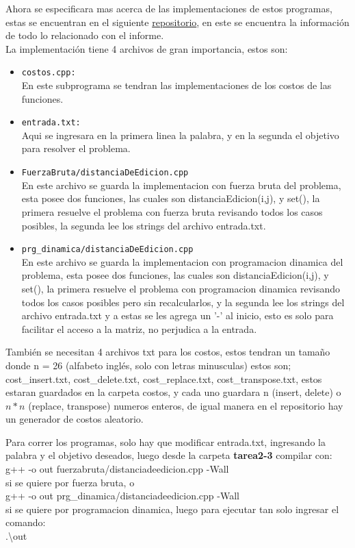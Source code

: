 Ahora se especificara mas acerca de las implementaciones de estos programas, estas se encuentran en el siguiente \href{https://github.com/Mappo1562/DistanciaMinimaDeEdicionExtendida}{repositorio}, en este se encuentra la información de todo lo relacionado con el informe.\\
La implementación tiene 4 archivos de gran importancia, estos son:
\begin{itemize}
    \item \texttt{costos.cpp:}\\ En este subprograma se tendran las implementaciones de los costos de las funciones.
    \item \texttt{entrada.txt:}\\ Aqui se ingresara en la primera linea la palabra, y en la segunda el objetivo para resolver el problema.
    \item \texttt{FuerzaBruta/distanciaDeEdicion.cpp}\\ En este archivo se guarda la implementacion con fuerza bruta del problema, esta posee dos funciones, las cuales son distanciaEdicion(i,j), y set(), la primera resuelve el problema con fuerza bruta revisando todos los casos posibles, la segunda lee los strings del archivo entrada.txt.
    \item \texttt{prg\_dinamica/distanciaDeEdicion.cpp}\\ En este archivo se guarda la implementacion con programacion dinamica del problema, esta posee dos funciones, las cuales son distanciaEdicion(i,j), y set(), la primera resuelve el problema con programacion dinamica revisando todos los casos posibles pero sin recalcularlos, y la segunda lee los strings del archivo entrada.txt y a estas se les agrega un '-' al inicio, esto es solo para facilitar el acceso a la matriz, no perjudica a la entrada.
\end{itemize}

También se necesitan 4 archivos txt para los costos, estos tendran un tamaño donde n = 26 (alfabeto inglés, solo con letras minusculas) estos son; cost\_insert.txt, cost\_delete.txt, cost\_replace.txt, cost\_transpose.txt, estos estaran guardados en la carpeta costos, y cada uno guardara n (insert, delete) o $n*n$ (replace, transpose) numeros enteros, de igual manera en el repositorio hay un generador de costos aleatorio.


Para correr los programas, solo hay que modificar entrada.txt, ingresando la palabra y el objetivo deseados, luego desde la carpeta \textbf{tarea2-3} compilar con:\\
g++ -o out fuerzabruta/distanciadeedicion.cpp -Wall\\
si se quiere por fuerza bruta, o\\
g++ -o out prg\_dinamica/distanciadeedicion.cpp -Wall\\
si se quiere por programacion dinamica, luego para ejecutar tan solo ingresar el comando:\\
.\textbackslash{}out
